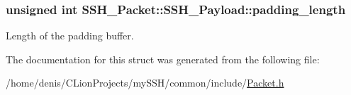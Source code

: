 \subsubsection[{\texorpdfstring{padding\+\_\+length}{padding_length}}]{\setlength{\rightskip}{0pt plus 5cm}unsigned int S\+S\+H\+\_\+\+Packet\+::\+S\+S\+H\+\_\+\+Payload\+::padding\+\_\+length}\hypertarget{structSSH__Packet_1_1SSH__Payload_a51efea1b4439c6e97e13d583406b3b88}{}\label{structSSH__Packet_1_1SSH__Payload_a51efea1b4439c6e97e13d583406b3b88}


Length of the padding buffer. 



The documentation for this struct was generated from the following file\+:\begin{DoxyCompactItemize}
\item 
/home/denis/\+C\+Lion\+Projects/my\+S\+S\+H/common/include/\hyperlink{Packet_8h}{Packet.\+h}\end{DoxyCompactItemize}
